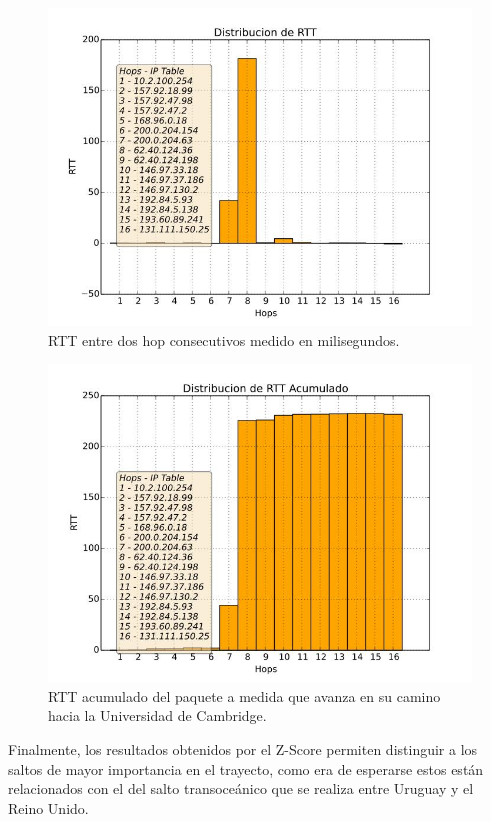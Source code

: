 \begin{figure}[H]
  \centering	
	\includegraphics[scale=0.4]{../cambridge-experiment/bar_rtt.jpeg}
  \caption{RTT entre dos hop consecutivos medido en milisegundos.}
	\label{fig:histo-src-sitiotrabajo}
\end{figure}

\begin{figure}[H]
  \centering	
	\includegraphics[scale=0.4]{../cambridge-experiment/bar_rtt_acum.jpeg}
  \caption{RTT acumulado del paquete a medida que avanza en su camino hacia la Universidad de Cambridge.}
	\label{fig:histo-src-sitiotrabajo}
\end{figure}

Finalmente, los resultados obtenidos por el Z-Score permiten distinguir a los saltos de mayor importancia en el trayecto, como era de esperarse estos están relacionados con el del salto transoceánico que se realiza entre Uruguay y el Reino Unido.

